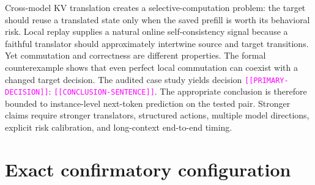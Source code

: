 \documentclass[10pt,twocolumn]{article}
\newcommand{\result}[1]{\textcolor{magenta}{\texttt{[[#1]]}}}
\begin{document}
Cross-model KV translation creates a selective-computation problem: the target
should reuse a translated state only when the saved prefill is worth its
behavioral risk.  Local replay supplies a natural online self-consistency
signal because a faithful translator should approximately intertwine source
and target transitions.  Yet commutation and correctness are different
properties.  The formal counterexample shows that even perfect local
commutation can coexist with a changed target decision.  The audited case
study yields decision \result{PRIMARY-DECISION}: \result{CONCLUSION-SENTENCE}.
The appropriate conclusion is therefore bounded to instance-level next-token
prediction on the tested pair.  Stronger claims require stronger translators,
structured actions, multiple model directions, explicit risk calibration, and
long-context end-to-end timing.




\appendix

\section{Exact confirmatory configuration}
\end{document}
